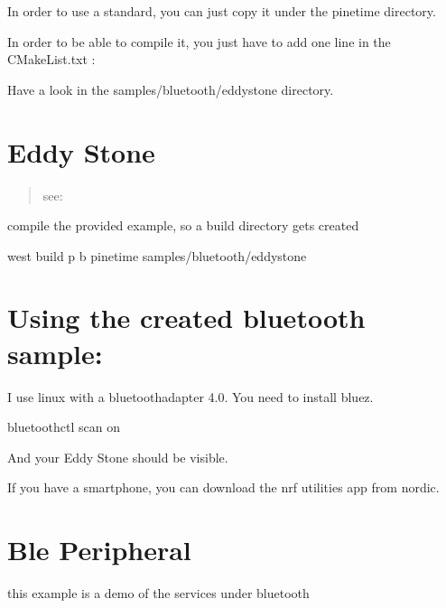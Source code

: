 \documentclass[letterpaper,10pt,english]{sphinxmanual}
\begin{document}
In order to use a standard, you can just copy it under the pinetime directory.

In order to be able to compile it, you just have to add one line in the CMakeList.txt :


Have a look in the samples/bluetooth/eddystone directory.


\section{Eddy Stone}
\label{\detokenize{bluetooth:eddy-stone}}\begin{quote}

see:   {\hyperref[\detokenize{samples/bluetooth/eddystone/README:bluetooth-eddystone-sample}]{}}
\end{quote}

  compile the provided example, so a build directory gets created

\begin{sphinxVerbatim}[commandchars=\\\{\}]
 west build \PYGZhy{}p \PYGZhy{}b pinetime samples/bluetooth/eddystone
\end{sphinxVerbatim}



\section{Using the created bluetooth sample:}
\label{\detokenize{bluetooth:using-the-created-bluetooth-sample}}
I use linux with a bluetoothadapter 4.0.
You need to install bluez.

\begin{sphinxVerbatim}[commandchars=\\\{\}]
bluetoothctl
scan on
\end{sphinxVerbatim}

And your Eddy Stone should be visible.

If you have a smartphone, you can download the nrf utilities app from nordic.


\section{Ble Peripheral}
\label{\detokenize{bluetooth:ble-peripheral}}
this example is a demo of the services under bluetooth
\end{document}
